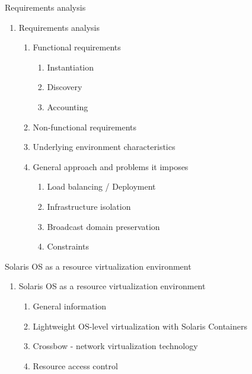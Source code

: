 \documentclass{beamer}
\begin{document}
\begin{frame}{Requirements analysis}

	\begin{enumerate}
		\setcounter{enumi}{\value{enumi_chapter}}

		\item Requirements analysis

			\begin{enumerate}

				\item Functional requirements

					\begin{enumerate}
						\item Instantiation
						\item Discovery
						\item Accounting
					\end{enumerate}

					\pause
			
			 \item Non-functional requirements \pause

			 \item Underlying environment characteristics \pause
		 
			 \item General approach and problems it imposes

			 	\begin{enumerate}
					\item Load balancing / Deployment
					\item Infrastructure isolation
					\item Broadcast domain preservation
					\item Constraints
				\end{enumerate}
		 
			\end{enumerate}

	\end{enumerate}

\end{frame}

\setcounter{enumi_chapter}{\value{enumi}}


\begin{frame}{Solaris OS as a resource virtualization environment}

	\begin{enumerate}
		\setcounter{enumi}{\value{enumi_chapter}}

		\item Solaris OS as a resource virtualization environment

			\begin{enumerate}
				\item General information \pause
				\item Lightweight OS-level virtualization with Solaris Containers \pause
				\item Crossbow - network virtualization technology \pause
				\item Resource access control
			\end{enumerate}

	\end{enumerate}

\end{frame}
\end{document}
